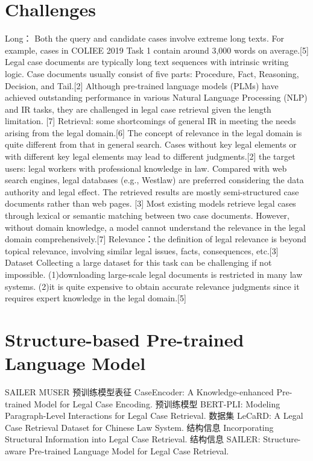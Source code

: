 \documentclass[lang=en,12pt]{beautybook}
\begin{document}
\section{Challenges}
Long：
Both the query and candidate cases involve extreme long texts. For example, cases in COLIEE 2019 Task 1 contain around 3,000 words on average.[5]
Legal case documents are typically long text sequences with intrinsic writing logic. Case documents usually consist of five parts: Procedure, Fact, Reasoning, Decision, and Tail.[2]
Although pre-trained language models (PLMs) have achieved outstanding performance in various Natural Language Processing (NLP) and IR tasks, they are challenged in legal case retrieval given the length limitation. [7]
Retrieval: some shortcomings of general IR in meeting the needs arising from the legal domain.[6]
The concept of relevance in the legal domain is quite different from that in general search. Cases without key legal elements or with different key legal elements may lead to different judgments.[2]
the target users: legal workers with professional knowledge in law. Compared with web search engines, legal databases (e.g., Westlaw) are preferred considering the data authority and legal effect. The retrieved results are mostly semi-structured case documents rather than web pages. [3]
Most existing models retrieve legal cases through lexical or semantic matching between two case documents. However, without domain knowledge, a model cannot understand the relevance in the legal domain comprehensively.[7]
Relevance：the definition of legal relevance is beyond topical relevance, involving similar legal issues, facts, consequences, etc.[3]
Dataset
Collecting a large dataset for this task can be challenging if not impossible. (1)downloading large-scale legal documents is restricted in many law systems. (2)it is quite expensive to obtain accurate relevance judgments since it requires expert knowledge in the legal domain.[5]

\section{Structure-based Pre-trained Language Model}
SAILER MUSER
预训练模型表征 CaseEncoder: A Knowledge-enhanced Pre-trained Model for Legal Case Encoding. 
预训练模型 BERT-PLI: Modeling Paragraph-Level Interactions for Legal Case Retrieval. 
数据集 LeCaRD: A Legal Case Retrieval Dataset for Chinese Law System. 
结构信息 Incorporating Structural Information into Legal Case Retrieval. 
结构信息 SAILER: Structure-aware Pre-trained Language Model for Legal Case Retrieval. 
\end{document}

